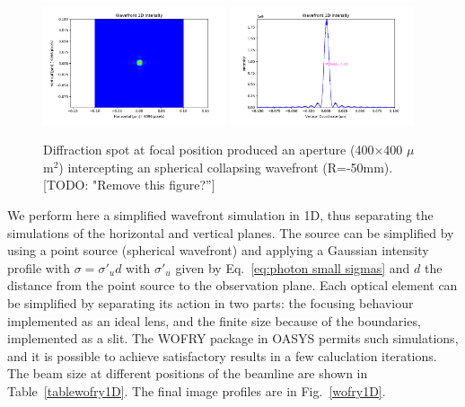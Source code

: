 \documentclass{iucr}              %
\newcommand{\todo}[1]{{\color{red}[TODO: "#1'']}}
\begin{document}
\begin{figure}
\label{wofry400um}
\centering
\includegraphics[width=0.48\textwidth]{GRAPHICS/wofry400umslit.png}
\includegraphics[width=0.48\textwidth]{GRAPHICS/wofry400umprofile.png}
\caption{Diffraction spot at focal position produced an aperture (400$\times$400 $\mu$m$^2$) intercepting an spherical collapsing wavefront (R=-50mm).
\todo{Remove this figure?}}
\end{figure}

We perform here a simplified wavefront simulation in 1D, thus separating the simulations of the horizontal and vertical planes. The source can be simplified by using a point source (spherical wavefront) and applying a Gaussian intensity profile with $\sigma=\sigma'_u d$ with $\sigma'_u$ given by Eq.~\ref{eq:photon small sigmas} and $d$ the distance from the point source to the observation plane. Each optical element can be simplified by separating its action in two parts: the focusing behaviour implemented as an ideal lens, and the finite size because of the boundaries, implemented as a slit. The WOFRY package in OASYS permits such simulations, and it is possible to achieve satisfactory results in a few caluclation iterations. The beam size at different positions of the beamline are shown in Table~\ref{tablewofry1D}. The final image profiles are in Fig.~\ref{wofry1D}.
\end{document}

